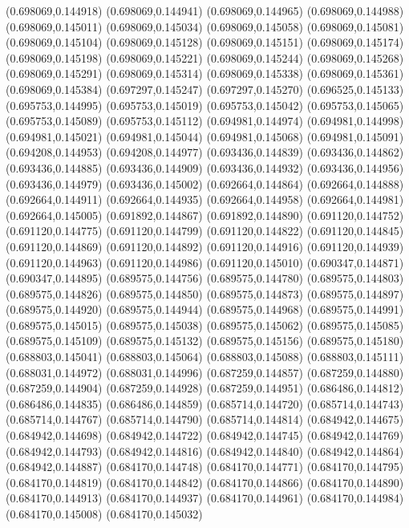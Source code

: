 (0.698069,0.144918)
(0.698069,0.144941)
(0.698069,0.144965)
(0.698069,0.144988)
(0.698069,0.145011)
(0.698069,0.145034)
(0.698069,0.145058)
(0.698069,0.145081)
(0.698069,0.145104)
(0.698069,0.145128)
(0.698069,0.145151)
(0.698069,0.145174)
(0.698069,0.145198)
(0.698069,0.145221)
(0.698069,0.145244)
(0.698069,0.145268)
(0.698069,0.145291)
(0.698069,0.145314)
(0.698069,0.145338)
(0.698069,0.145361)
(0.698069,0.145384)
(0.697297,0.145247)
(0.697297,0.145270)
(0.696525,0.145133)
(0.695753,0.144995)
(0.695753,0.145019)
(0.695753,0.145042)
(0.695753,0.145065)
(0.695753,0.145089)
(0.695753,0.145112)
(0.694981,0.144974)
(0.694981,0.144998)
(0.694981,0.145021)
(0.694981,0.145044)
(0.694981,0.145068)
(0.694981,0.145091)
(0.694208,0.144953)
(0.694208,0.144977)
(0.693436,0.144839)
(0.693436,0.144862)
(0.693436,0.144885)
(0.693436,0.144909)
(0.693436,0.144932)
(0.693436,0.144956)
(0.693436,0.144979)
(0.693436,0.145002)
(0.692664,0.144864)
(0.692664,0.144888)
(0.692664,0.144911)
(0.692664,0.144935)
(0.692664,0.144958)
(0.692664,0.144981)
(0.692664,0.145005)
(0.691892,0.144867)
(0.691892,0.144890)
(0.691120,0.144752)
(0.691120,0.144775)
(0.691120,0.144799)
(0.691120,0.144822)
(0.691120,0.144845)
(0.691120,0.144869)
(0.691120,0.144892)
(0.691120,0.144916)
(0.691120,0.144939)
(0.691120,0.144963)
(0.691120,0.144986)
(0.691120,0.145010)
(0.690347,0.144871)
(0.690347,0.144895)
(0.689575,0.144756)
(0.689575,0.144780)
(0.689575,0.144803)
(0.689575,0.144826)
(0.689575,0.144850)
(0.689575,0.144873)
(0.689575,0.144897)
(0.689575,0.144920)
(0.689575,0.144944)
(0.689575,0.144968)
(0.689575,0.144991)
(0.689575,0.145015)
(0.689575,0.145038)
(0.689575,0.145062)
(0.689575,0.145085)
(0.689575,0.145109)
(0.689575,0.145132)
(0.689575,0.145156)
(0.689575,0.145180)
(0.688803,0.145041)
(0.688803,0.145064)
(0.688803,0.145088)
(0.688803,0.145111)
(0.688031,0.144972)
(0.688031,0.144996)
(0.687259,0.144857)
(0.687259,0.144880)
(0.687259,0.144904)
(0.687259,0.144928)
(0.687259,0.144951)
(0.686486,0.144812)
(0.686486,0.144835)
(0.686486,0.144859)
(0.685714,0.144720)
(0.685714,0.144743)
(0.685714,0.144767)
(0.685714,0.144790)
(0.685714,0.144814)
(0.684942,0.144675)
(0.684942,0.144698)
(0.684942,0.144722)
(0.684942,0.144745)
(0.684942,0.144769)
(0.684942,0.144793)
(0.684942,0.144816)
(0.684942,0.144840)
(0.684942,0.144864)
(0.684942,0.144887)
(0.684170,0.144748)
(0.684170,0.144771)
(0.684170,0.144795)
(0.684170,0.144819)
(0.684170,0.144842)
(0.684170,0.144866)
(0.684170,0.144890)
(0.684170,0.144913)
(0.684170,0.144937)
(0.684170,0.144961)
(0.684170,0.144984)
(0.684170,0.145008)
(0.684170,0.145032)
